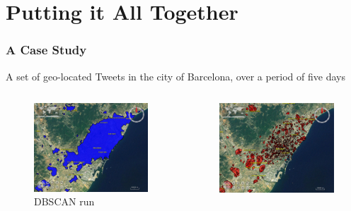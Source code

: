\documentclass[hyperref={pdfpagelabels=true}]{beamer}
\begin{document}

\section{Putting it All Together} 
\begin{frame}
\frametitle{A Case Study}
 A set of geo-located Tweets in the city of Barcelona, over a period of five days
\begin{columns}
  \begin{column}{0.5\textwidth}
    \begin{figure}  
	\includegraphics[width=\textwidth]{sim1b.png}\\
           \tiny{DBSCAN run}%
       \end{figure}             
  \end{column}
  \begin{column}{0.5\textwidth}
      \begin{figure}  
	\includegraphics[width=\textwidth]{sim6.png}\\

\end{figure}
\end{column}
\end{columns}
\end{frame}
\end{document}
